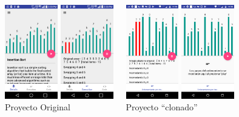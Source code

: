 \documentclass[aspectratio=169]{beamer}
\begin{document}
\begin{frame}
\begin{columns}[c] %
\begin{center}
\includegraphics[width=2.3cm]{Piratazo_Orig1}\hspace{0.05cm}
\includegraphics[width=2.3cm]{Piratazo_Orig2}\\
Proyecto Original
\end{center}
\begin{center}
\includegraphics[width=2.3cm]{Piratazo_Oscar1}\hspace{0.05cm}
\includegraphics[width=2.3cm]{Piratazo_Oscar2}\\
Proyecto ``clonado''
\end{center}	
\end{columns}
\end{frame}
\end{document}
